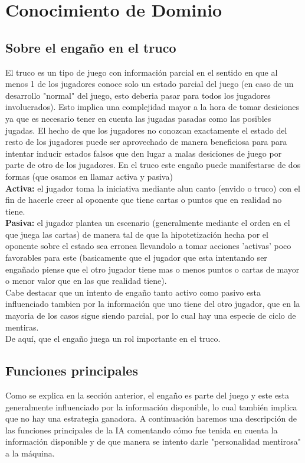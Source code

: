 \documentclass[12pt,a4paper]{article}
\begin{document}
\section{Conocimiento de Dominio}

\subsection*{Sobre el enga\~no en el truco}

El truco es un tipo de juego con informaci\'on parcial en el sentido en que al menos 1 de los jugadores
conoce solo un estado parcial del juego (en caso de un desarrollo "normal" del juego, esto deberia 
pasar para todos los jugadores involucrados). Esto implica una complejidad mayor a la hora de tomar desiciones
ya que es necesario tener en cuenta las jugadas pasadas como las posibles jugadas. 
El hecho de que los jugadores no conozcan exactamente el estado del resto de los jugadores puede ser aprovechado
de manera beneficiosa para para intentar inducir estados falsos que den lugar a malas desiciones de juego 
por parte de otro de los jugadores. En el truco este enga\~no puede manifestarse de dos formas (que osamos en llamar
activa y pasiva)\\
\textbf{Activa:} el jugador toma la iniciativa mediante alun canto (envido o truco) con el fin de hacerle creer al oponente que tiene
cartas o puntos que en realidad no tiene.\\
\textbf{Pasiva:} el jugador plantea un escenario (generalmente mediante el orden en el que juega las cartas) de manera tal de que 
la hipotetizaci\'on hecha por el oponente sobre el estado sea erronea llevandolo a tomar acciones 'activas' poco favorables para 
este (basicamente que el jugador que esta intentando ser enga\~nado piense que el otro jugador tiene mas o menos puntos o cartas de 
mayor o menor valor que en las que realidad tiene).\\
Cabe destacar que un intento de enga\~no tanto activo como pasivo esta influenciado tambien por la informaci\'on que uno tiene del otro jugador,
que en la mayoria de los casos sigue siendo parcial,  por lo cual hay una especie de ciclo de mentiras.\\
De aqu\'i, que el enga\~no juega un rol importante en el truco.

\subsection*{Funciones principales}
Como se explica en la secci\'on anterior, el enga\~no es parte del juego y este esta generalmente influenciado por
la informaci\'on disponible, lo cual tambi\'en implica que no hay una estrategia ganadora. 
A continuaci\'on haremos una descripci\'on de las funciones principales de la IA comentando c\'omo fue tenida en cuenta la 
informaci\'on disponible y de que manera se intento darle "personalidad mentirosa" a la m\'aquina.
\end{document}
